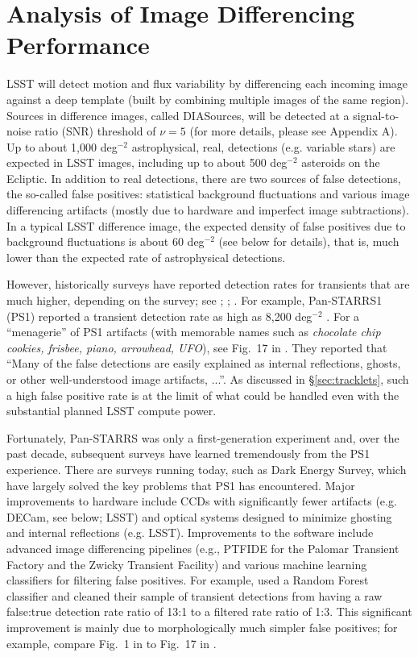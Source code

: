 \section{Analysis of Image Differencing Performance \label{sec:imDiff}}

LSST will detect motion and flux variability by differencing each incoming image 
against a deep template (built by combining multiple images of the same region). 
Sources in difference images, called DIASources, will be detected at a signal-to-noise 
ratio (SNR) threshold of $\nu=5$ (for more details, please see Appendix A). Up to about 1,000 deg$^{-2}$ 
astrophysical, real, detections (e.g. variable stars) are expected in LSST images, including 
up to about 500 deg$^{-2}$ asteroids on the Ecliptic. In addition to real detections, there 
are two sources of false detections, the so-called false positives: statistical background 
fluctuations and various image differencing artifacts (mostly due to hardware and imperfect 
image subtractions). In a typical LSST difference image, the expected density of false positives
due to background fluctuations is about 60 deg$^{-2}$ (see below for details), that is, much 
lower than the expected rate of astrophysical detections. 

However, historically surveys have reported detection rates for transients that are much
higher, depending on the survey; see \cite{denneau13}; \cite{kessler15}; \cite{goldstein15}. 
For example, Pan-STARRS1 (PS1) reported a transient detection rate as high as 8,200 deg$^{-2}$ 
\citep{denneau13}. For a ``menagerie'' of PS1 artifacts (with memorable names such as 
{\it chocolate chip cookies, frisbee, piano, arrowhead, UFO}), see Fig.~17 in \cite{denneau13}. 
They reported that ``Many of the false detections are easily explained as internal reflections, 
ghosts, or other well-understood image artifacts, ...''. As discussed in \S\ref{sec:tracklets}, 
such a high false positive rate is at the limit of what could be handled even with the substantial
planned LSST compute power. 

Fortunately, Pan-STARRS was only a first-generation experiment and, over the past decade, 
subsequent surveys have learned tremendously from the PS1 experience. There are surveys 
running today, such as Dark Energy Survey, which have largely solved the key problems that 
PS1 has encountered. Major improvements to hardware include CCDs with significantly fewer 
artifacts (e.g. DECam, see below; LSST) and optical systems designed to minimize ghosting 
and internal reflections (e.g. LSST). Improvements to the software include advanced image 
differencing pipelines (e.g., PTFIDE for the Palomar Transient Factory and the Zwicky Transient 
Facility) and various machine learning classifiers for filtering false positives. For example,
\cite{goldstein15} used a Random Forest classifier and cleaned their sample of transient 
detections from having a raw false:true detection rate ratio of 13:1 to a filtered rate ratio 
of 1:3. This significant improvement is mainly due to morphologically much simpler false 
positives; for example, compare Fig.~1 in \cite{goldstein15} to Fig.~17 in \cite{denneau13}. 

